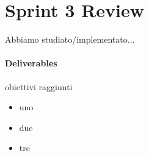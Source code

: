 \section{Sprint 3 Review}
Abbiamo studiato/implementato...
\paragraph{Deliverables} 
obiettivi raggiunti
\begin{itemize}
    \item uno
    \item due
    \item tre
\end{itemize}
